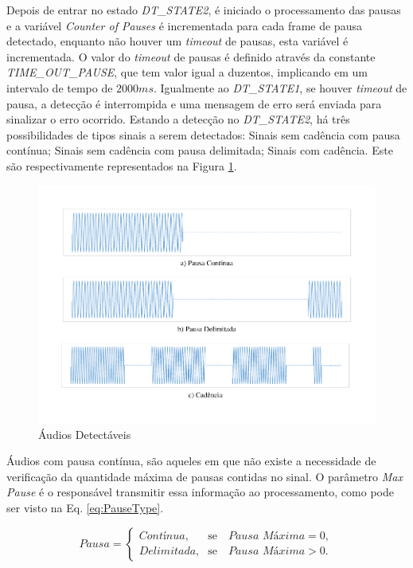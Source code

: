 \documentclass[monografia]{subfiles}
\begin{document}
				Depois de entrar no estado \textit{DT\_STATE2}, é iniciado o processamento das pausas e a variável \textit{Counter of Pauses} é incrementada
				para cada frame de pausa detectado, enquanto não houver um \textit{timeout} de pausas, esta variável  é incrementada. O valor do 
				\textit{timeout} de pausas é definido através da constante \textit{TIME\_OUT\_PAUSE}, que tem valor igual a duzentos, implicando em um intervalo de tempo
				de $2000 ms$. Igualmente ao \textit{DT\_STATE1}, se houver \textit{timeout} de pausa, a detecção é interrompida e uma mensagem de erro será enviada
				para sinalizar o erro ocorrido.	Estando a detecção no \textit{DT\_STATE2}, há três possibilidades de tipos sinais a serem 
				detectados: Sinais sem cadência com pausa contínua; Sinais sem cadência com pausa delimitada; Sinais com cadência. 
				Este são respectivamente representados na Figura \ref{fig:audioTypesDT2}. 

					\begin{figure}[!h]
					\centering
						\includegraphics[scale=1.15]{img/audios/allTypesDTSTATE2.pdf}
					\caption{Áudios Detectáveis}
					\label{fig:audioTypesDT2}
					\end{figure}

				Áudios com pausa contínua, são aqueles em que não existe a necessidade de verificação da quantidade máxima de pausas contidas no sinal.
				O parâmetro \textit{Max Pause} é o responsável transmitir essa informação ao processamento, como pode ser visto na Eq. \ref{eq:PauseType}.

				 \begin{equation}
					Pausa = \left\{\begin{array}{rc}
					\textit{Contínua},&\mbox{se}\quad \textit{Pausa Máxima} = 0,\\
					\textit{Delimitada}, &\mbox{se}\quad \textit{Pausa Máxima} > 0.
				\end{array}\right.
				\label{eq:PauseType}
				\end{equation}
\end{document}
